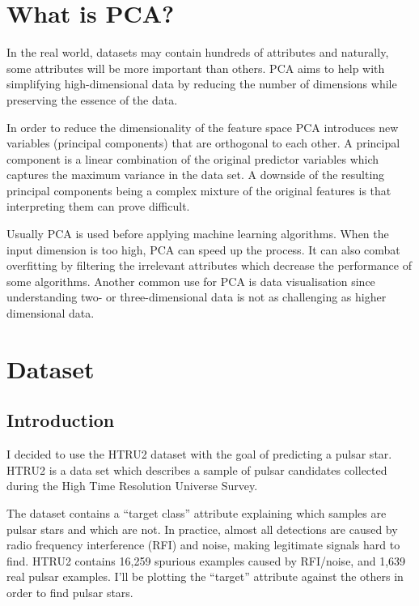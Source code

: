 \documentclass[a4paper,12pt]{article}
\begin{document}
    \section{What is PCA?}
    In the real world, datasets may contain hundreds of attributes and naturally, some attributes will be more important than others. PCA aims to help with simplifying high-dimensional data by reducing the number of dimensions while preserving the essence of the data. \par
    In order to reduce the dimensionality of the feature space PCA introduces new variables (principal components) that are orthogonal to each other. A principal component is a linear combination of the original predictor variables which captures the maximum variance in the data set. A downside of the resulting principal components being a complex mixture of the original features is that interpreting them can prove difficult.\par
    Usually PCA is used before applying machine learning algorithms. When the input dimension is too high, PCA can speed up the process. It can also combat overfitting by filtering the irrelevant attributes which decrease the performance of some algorithms. Another common use for PCA is data visualisation since understanding two- or three-dimensional data is not as challenging as higher dimensional data.\par


    \newpage

    \section{Dataset}
    \subsection{Introduction}
    I decided to use the HTRU2 dataset with the goal of predicting a pulsar star. HTRU2 is a data set which describes a sample of pulsar candidates collected during the High Time Resolution Universe Survey.\cite{highTimeResolution}  \par
    The dataset contains a “target class” attribute explaining which samples are pulsar stars and which are not. In practice, almost all detections are caused by radio frequency interference (RFI) and noise, making legitimate signals hard to find. HTRU2 contains 16,259 spurious examples caused by RFI/noise, and 1,639 real pulsar examples. I’ll be plotting the “target” attribute against the others in order to find pulsar stars.\cite{htru2}
\end{document}
